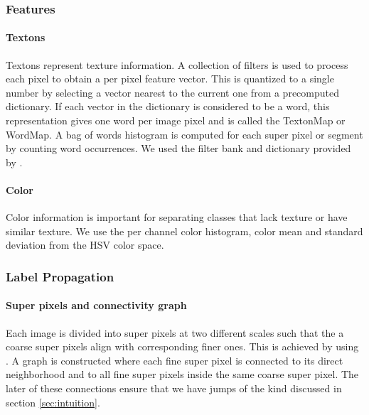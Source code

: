 \documentclass{article} %
\begin{document}
\subsubsection{Features}
\paragraph{Textons}
Textons represent texture information.
A collection of filters is used to process each pixel to obtain a per
pixel feature vector.
This is quantized to a single number by selecting a vector nearest to the
current one from a precomputed dictionary.
If each vector in the dictionary is considered to be a word, this
representation gives one word per image pixel and is called the TextonMap
or WordMap. %
A bag of words histogram is computed for each super pixel or segment by
counting word occurrences.
We used the filter bank and dictionary provided by \cite{malisiewicz-cvpr08}.

\paragraph{Color}
Color information is important for separating classes that lack texture or
have similar texture.
We use the per channel color histogram, color mean and standard deviation
from the HSV color space.
\subsubsection{Label Propagation}
\label{sec:labprop}
\paragraph{Super pixels and connectivity graph}
Each image is divided into super pixels at two different scales such that
the a coarse super pixels align with corresponding finer ones.
This is achieved by using \cite{}.%
A graph is constructed where each fine super pixel is connected to its
direct neighborhood and to all fine super pixels inside the same
coarse super pixel.
The later of these connections ensure that we have jumps of the kind discussed in section \ref{sec:intuition}.
\end{document}

